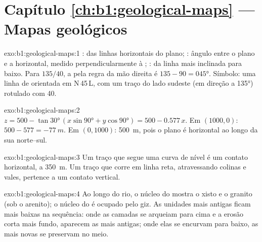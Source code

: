 \section*{Capítulo \ref{ch:b1:geological-maps} --- Mapas geológicos}

\begin{solution}{exo:b1:geological-maps:1}
:  das linhas horizontais do plano; : ângulo entre o plano e a horizontal, medido perpendicularmente à ; :  da linha mais inclinada para baixo. Para $135/40$, a  pela regra da mão direita é $135 - 90 = \ang{045}$. Símbolo: uma linha de  orientada em N\,45\,L, com um traço do lado sudeste (em direção a \ang{135}) rotulado com 40.
\end{solution}

\begin{solution}{exo:b1:geological-maps:2}
$z = 500 - \tan\ang{30}\,(x\sin\ang{90} + y\cos\ang{90}) = 500 - 0.577\,x$.
Em $(1000, 0)$: $500 - 577 = \qty{-77}{m}$. Em $(0, 1000)$: \qty{500}{m}, pois o plano é horizontal ao longo da sua  norte--sul.
\end{solution}

\begin{solution}{exo:b1:geological-maps:3}
Um traço que segue uma curva de nível é um contato horizontal, a \qty{350}{m}. Um traço que corre em linha reta, atravessando colinas e vales, pertence a um contato vertical.
\end{solution}

\begin{solution}{exo:b1:geological-maps:4}
Ao longo do rio, o núcleo do  mostra o xisto e o granito (sob o arenito); o núcleo do  é ocupado pelo giz. As unidades mais antigas ficam mais baixas na sequência: onde as camadas se arqueiam para cima e a erosão corta mais fundo, aparecem as mais antigas; onde elas se encurvam para baixo, as mais novas se preservam no meio.
\end{solution}

